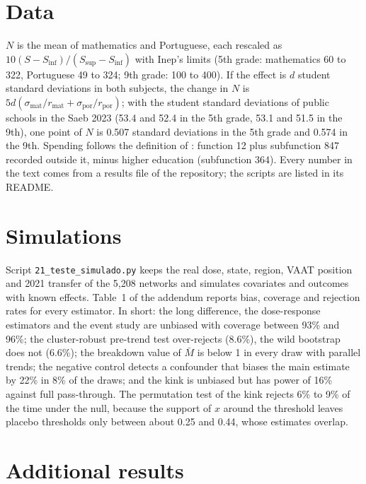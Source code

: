 \documentclass[12pt,letterpaper]{article}
\begin{document}
\section{Data}\label{app:dados}

$N$ is the mean of mathematics and Portuguese, each rescaled as $10(S - S_{\inf})/(S_{\sup} - S_{\inf})$ with Inep's limits (5th grade: mathematics 60 to 322, Portuguese 49 to 324; 9th grade: 100 to 400). If the effect is $d$ student standard deviations in both subjects, the change in $N$ is $5d(\sigma_{\text{mat}}/r_{\text{mat}} + \sigma_{\text{por}}/r_{\text{por}})$; with the student standard deviations of public schools in the Saeb 2023 (53.4 and 52.4 in the 5th grade, 53.1 and 51.5 in the 9th), one point of $N$ is 0.507 standard deviations in the 5th grade and 0.574 in the 9th. Spending follows the definition of \citet{cunha2026a}: function 12 plus subfunction 847 recorded outside it, minus higher education (subfunction 364). Every number in the text comes from a results file of the repository; the scripts are listed in its README.

\section{Simulations}\label{app:sim}

Script \texttt{21\_teste\_simulado.py} keeps the real dose, state, region, VAAT position and 2021 transfer of the 5,208 networks and simulates covariates and outcomes with known effects. Table~1 of the addendum reports bias, coverage and rejection rates for every estimator. In short: the long difference, the dose-response estimators and the event study are unbiased with coverage between 93\% and 96\%; the cluster-robust pre-trend test over-rejects (8.6\%), the wild bootstrap does not (6.6\%); the breakdown value of $\bar M$ is below 1 in every draw with parallel trends; the negative control detects a confounder that biases the main estimate by 22\% in 8\% of the draws; and the kink is unbiased but has power of 16\% against full pass-through. The permutation test of the kink rejects 6\% to 9\% of the time under the null, because the support of $x$ around the threshold leaves placebo thresholds only between about 0.25 and 0.44, whose estimates overlap.

\section{Additional results}\label{app:extra}
\setcounter{table}{0}\setcounter{posttable}{0}\setcounter{figure}{0}\setcounter{postfigure}{0}
\renewcommand{\thetable}{D\arabic{table}}\renewcommand{\theposttable}{D\arabic{posttable}}\renewcommand{\theHtable}{D\arabic{table}}
\renewcommand{\thefigure}{D\arabic{figure}}\renewcommand{\thepostfigure}{D\arabic{postfigure}}\renewcommand{\theHfigure}{D\arabic{figure}}
\end{document}
